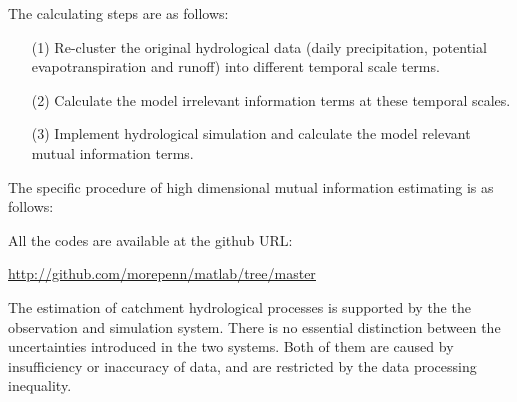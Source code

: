 The calculating steps are as follows:
 \begin{enumerate}
 \item [(1)]Re-cluster the original hydrological data 
(daily precipitation, potential evapotranspiration and 
runoff) into different temporal scale terms. 
 \item [(2)]Calculate the  model irrelevant information 
terms  at these temporal scales.
 \item [(3)]Implement hydrological simulation and calculate 
the model relevant mutual information terms.
 \end{enumerate}

The specific procedure of high dimensional mutual 
information estimating is as follows:

 
All the codes are available at the github URL: 

{\href{http://github.com/morepenn/matlab/tree/master}
{\underline
{http://github.com/morepenn/matlab/tree/master}}}






The estimation of catchment hydrological processes is 
supported by the   the observation and simulation system. 
There is no essential distinction between the uncertainties 
introduced in the two systems. Both of them are caused by 
insufficiency or inaccuracy of data, and are restricted by 
the data processing inequality\citep{cover2012elements}.

